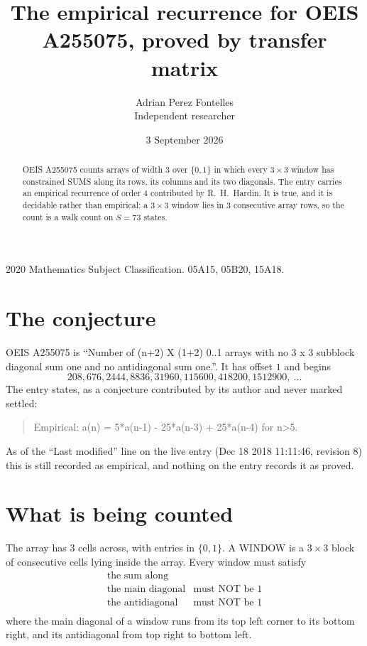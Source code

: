 \documentclass[11pt,a4paper]{article}
\title{The empirical recurrence for OEIS A255075, proved by transfer matrix}
\author{Adrian Perez Fontelles\\ \small Independent researcher}
\date{3 September 2026}
\theoremstyle{plain}
\theoremstyle{definition}
\begin{document}
\maketitle

\begin{abstract}
OEIS A255075 counts arrays of width $3$ over $\{0,1\}$ in which every $3\times3$ window has
constrained SUMS along its rows, its columns and its two diagonals. The entry carries an
empirical recurrence of order $4$ contributed by R.~H.~Hardin. It is true, and it is
decidable rather than empirical: a $3\times3$ window lies in $3$ consecutive array rows,
so the count is a walk count on $S=73$ states.
\end{abstract}

\noindent\small 2020 Mathematics Subject Classification. 05A15, 05B20, 15A18.\normalsize

\section{The conjecture}

OEIS A255075 is ``Number of (n+2) X (1+2) 0..1 arrays with no 3 x 3 subblock diagonal sum one and no antidiagonal sum one.''. It has offset $1$ and begins
\[
208, 676, 2444, 8836, 31960, 115600, 418200, 1512900,\ \dots
\]
The entry states, as a conjecture contributed by its author and never marked settled:
\begin{quote}
Empirical: a(n) = 5*a(n-1) - 25*a(n-3) + 25*a(n-4) for n>5.
\end{quote}
As of the ``Last modified'' line on the live entry (Dec 18 2018 11:11:46, revision 8) this is still
recorded as empirical, and nothing on the entry records it as proved.

\section{What is being counted}

The array has $3$ cells across, with entries in $\{0,1\}$. A WINDOW is a $3\times3$ block
of consecutive cells lying inside the array. Every window must satisfy
\[
\begin{array}{ll}
\text{the sum along} & \text{} \\[2pt]
\text{the main diagonal} & \text{must NOT be 1} \\
\text{the antidiagonal} & \text{must NOT be 1} \\
\end{array}
\]
where the main diagonal of a window runs from its top left corner to its bottom right, and its
antidiagonal from top right to bottom left.
\end{document}
